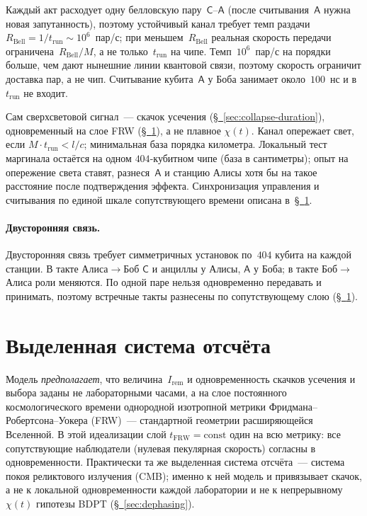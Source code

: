 \documentclass[11pt,a4paper]{article}
\newcommand{\Ost}{I_{\mathrm{rem}}}
\newcommand{\qC}{\mathsf{C}}
\newcommand{\qA}{\mathsf{A}}
\begin{document}
Каждый акт расходует одну белловскую пару~$\qC$--$\qA$ (после считывания~$\qA$ нужна новая запутанность), поэтому устойчивый канал требует темп раздачи $R_{\mathrm{Bell}}=1/t_{\mathrm{run}}\sim10^6$~пар/с; при меньшем~$R_{\mathrm{Bell}}$ реальная скорость передачи ограничена~$R_{\mathrm{Bell}}/M$, а не только~$t_{\mathrm{run}}$ на чипе. Темп~$10^6$~пар/с на порядки больше, чем дают нынешние линии квантовой связи, поэтому скорость ограничит доставка пар, а не чип. Считывание кубита~$\qA$ у Боба занимает около~$100$~нс и в~$t_{\mathrm{run}}$ не входит.

Сам сверхсветовой сигнал~--- скачок усечения (\hyperref[sec:collapse-duration]{\S~\ref*{sec:collapse-duration}}), одновременный на слое FRW (\hyperref[sec:comoving]{\S~\ref*{sec:comoving}}), а не плавное $\chi(t)$. Канал опережает свет, если $M\cdot t_{\mathrm{run}}<l/c$; минимальная база порядка километра. Локальный тест маргинала остаётся на одном $404$-кубитном чипе (база в сантиметры); опыт на опережение света ставят, разнеся~$\qA$ и станцию Алисы хотя бы на такое расстояние после подтверждения эффекта. Синхронизация управления и считывания по единой шкале сопутствующего времени описана в~\hyperref[sec:comoving]{\S~\ref*{sec:comoving}}.

\paragraph{Двусторонняя связь.}
Двусторонняя связь требует симметричных установок по~$404$ кубита на каждой станции. В такте Алиса$\to$Боб $\qC$ и анциллы у Алисы, $\qA$ у Боба; в такте Боб$\to$Алиса роли меняются. По одной паре нельзя одновременно передавать и принимать, поэтому встречные такты разнесены по сопутствующему слою (\hyperref[sec:comoving]{\S~\ref*{sec:comoving}}).

\section{Выделенная система отсчёта}
\label{sec:comoving}

Модель \emph{предполагает}, что величина~$\Ost$ и одновременность скачков усечения и выбора заданы не лабораторными часами, а на слое постоянного космологического времени однородной изотропной метрики Фридмана--Робертсона--Уокера (FRW)~--- стандартной геометрии расширяющейся Вселенной. В этой идеализации слой $t_{\mathrm{FRW}}=\mathrm{const}$ один на всю метрику: все сопутствующие наблюдатели (нулевая пекулярная скорость) согласны в одновременности. Практически та же выделенная система отсчёта~--- система покоя реликтового излучения (CMB); именно к ней модель и привязывает скачок, а не к локальной одновременности каждой лаборатории и не к непрерывному $\chi(t)$ гипотезы BDPT (\hyperref[sec:dephasing]{\S~\ref*{sec:dephasing}}).
\end{document}
